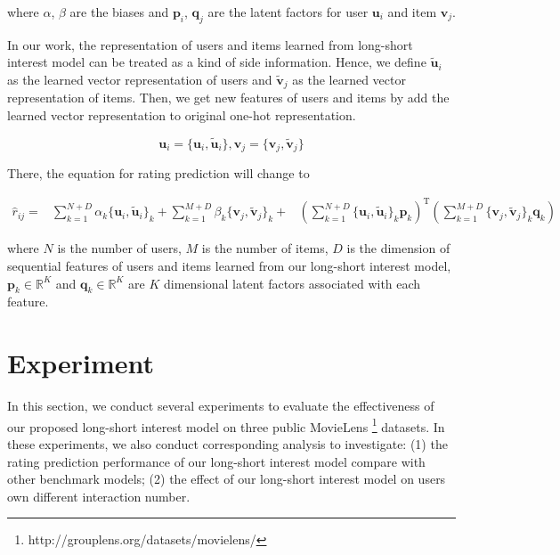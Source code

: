 \documentclass{llncs}
\begin{document}
where $\alpha$, $\beta$ are the biases and $\mathbf{p}_i$, $\mathbf{q}_j$
are the latent factors for user $\mathbf{u}_i$ and item $\mathbf{v}_j$.

In our work, the representation of users and items
learned from long-short interest model can be treated as a kind of side information.
Hence, we define $\tilde{\mathbf{u}}_i$ as
the learned vector representation of users and $\tilde{\mathbf{v}}_j$ as
the learned vector representation of items.
Then, we get new features of users and items by add the learned vector representation
to original one-hot representation.

\begin{equation}
\mathbf{u}_{i} = \{ \mathbf{u}_{i} , \tilde{\mathbf{u}}_i \} , 
\mathbf{v}_{j} = \{ \mathbf{v}_{j} , \tilde{\mathbf{v}}_j \}
\end{equation}

There, the equation for rating prediction will change to

\begin{equation}
\begin{aligned}
\hat{r}_{ij} =
&\sum_{k=1}^{N+D} \alpha_k \{ \mathbf{u}_i , \tilde{\mathbf{u}}_i \}_k +
\sum_{k=1}^{M+D} \beta_k  \{ \mathbf{v}_j , \tilde{\mathbf{v}}_j \}_k + 
&\left( \sum_{k=1}^{N+D} \{ \mathbf{u}_i , \tilde{\mathbf{u}}_i \}_k \mathbf{p}_k \right) ^ \mathrm{T}
\left( \sum_{k=1}^{M+D} \{ \mathbf{v}_j , \tilde{\mathbf{v}}_j \}_k \mathbf{q}_k \right)
\end{aligned}
\end{equation}

where $N$ is the number of users, $M$ is the number of items,
$D$ is the dimension of sequential features of users and items learned from
our long-short interest model,
$\mathbf{p}_{k} \in \mathbb{R}^K$ and $\mathbf{q}_{k} \in \mathbb{R}^K$
are $K$ dimensional latent factors associated with each feature.

\section{Experiment}
In this section, we conduct several experiments to evaluate the effectiveness
of our proposed long-short interest model on three public
MovieLens \footnote{http://grouplens.org/datasets/movielens/} datasets.
In these experiments, we also conduct corresponding analysis to investigate:
(1) the rating prediction performance of our long-short interest model
compare with other benchmark models;
(2) the effect of our long-short interest model on users own different interaction number.
\end{document}
